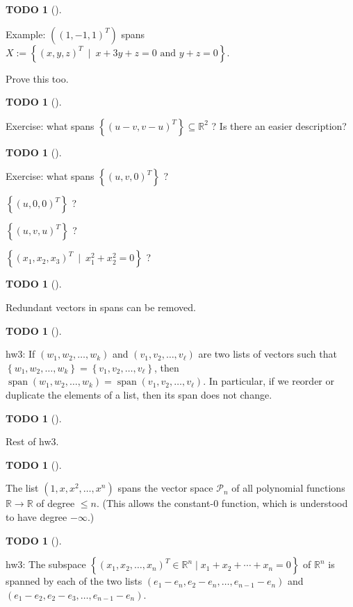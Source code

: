 \documentclass[numbers=enddot,12pt,final,onecolumn,notitlepage]{scrartcl}%
\theoremstyle{definition}
\newtheorem{quest}[theo]{TODO}
\newenvironment{todo}[1][]
{\begin{quest}[#1]\begin{leftbar}}
{\end{leftbar}\end{quest}}
\begin{document}
\begin{todo}
Example: $\left(  \left(  1,-1,1\right)  ^{T}\right)  $ spans $X:=\left\{
\left(  x,y,z\right)  ^{T}\ \mid\ x+3y+z=0\text{ and }y+z=0\right\}  $.

Prove this too.
\end{todo}

\begin{todo}
Exercise: what spans $\left\{  \left(  u-v,v-u\right)  ^{T}\right\}
\subseteq\mathbb{R}^{2}$ ? Is there an easier description?
\end{todo}

\begin{todo}
Exercise: what spans $\left\{  \left(  u,v,0\right)  ^{T}\right\}  $ ?

$\left\{  \left(  u,0,0\right)  ^{T}\right\}  $ ?

$\left\{  \left(  u,v,u\right)  ^{T}\right\}  $ ?

$\left\{  \left(  x_{1},x_{2},x_{3}\right)  ^{T}\ \mid\ x_{1}^{2}+x_{2}%
^{2}=0\right\}  $ ?
\end{todo}

\begin{todo}
Redundant vectors in spans can be removed.
\end{todo}

\begin{todo}
hw3: If $\left(  w_{1}, w_{2}, \ldots, w_{k}\right)  $ and $\left(  v_{1},
v_{2}, \ldots, v_{\ell}\right)  $ are two lists of vectors such that $\left\{
w_{1}, w_{2}, \ldots, w_{k}\right\}  = \left\{  v_{1}, v_{2}, \ldots, v_{\ell
}\right\}  $, then $\operatorname{span}\left(  w_{1}, w_{2}, \ldots,
w_{k}\right)  = \operatorname{span}\left(  v_{1}, v_{2}, \ldots, v_{\ell
}\right)  $. In particular, if we reorder or duplicate the elements of a list,
then its span does not change.
\end{todo}

\begin{todo}
Rest of hw3.
\end{todo}

\begin{todo}
The list $\left(  1, x, x^{2}, \ldots, x^{n}\right)  $ spans the vector space
$\mathcal{P}_{n}$ of all polynomial functions $\mathbb{R} \to\mathbb{R}$ of
degree $\leq n$. (This allows the constant-$0$ function, which is understood
to have degree $-\infty$.)
\end{todo}

\begin{todo}
hw3: The subspace $\left\{  \left(  x_{1}, x_{2}, \ldots, x_{n}\right)  ^{T}
\in\mathbb{R}^{n} \mid x_{1} + x_{2} + \cdots+ x_{n} = 0 \right\}  $ of
$\mathbb{R}^{n}$ is spanned by each of the two lists $\left(  e_{1}-e_{n},
e_{2}-e_{n}, \ldots, e_{n-1}-e_{n}\right)  $ and $\left(  e_{1}-e_{2},
e_{2}-e_{3}, \ldots, e_{n-1}-e_{n}\right)  $.
\end{todo}
\end{document}
